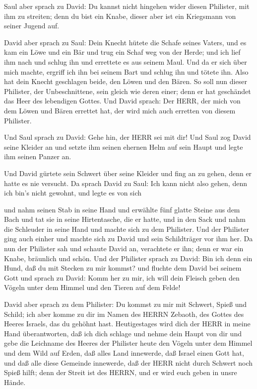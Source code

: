  Saul aber sprach zu David: Du kannst nicht hingehen wider
diesen Philister, mit ihm zu streiten; denn du bist ein Knabe, dieser
aber ist ein Kriegsmann von seiner Jugend auf.

 David aber sprach zu Saul: Dein Knecht hütete die Schafe
seines Vaters, und es kam ein Löwe und ein Bär und trug ein Schaf weg
von der Herde;  und ich lief ihm nach und schlug ihn und
errettete es aus seinem Maul. Und da er sich über mich machte, ergriff
ich ihn bei seinem Bart und schlug ihn und tötete ihn. 
Also hat dein Knecht geschlagen beide, den Löwen und den Bären. So soll
nun dieser Philister, der Unbeschnittene, sein gleich wie deren einer;
denn er hat geschändet das Heer des lebendigen Gottes.  Und
David sprach: Der HERR, der mich von dem Löwen und Bären errettet hat,
der wird mich auch erretten von diesem Philister.

 Und Saul sprach zu David: Gehe hin, der HERR sei mit dir!
Und Saul zog David seine Kleider an und setzte ihm seinen ehernen Helm
auf sein Haupt und legte ihm seinen Panzer an.

 Und David gürtete sein Schwert über seine Kleider und fing
an zu gehen, denn er hatte es nie versucht. Da sprach David zu Saul: Ich
kann nicht also gehen, denn ich bin's nicht gewohnt, und legte es von
sich

 und nahm seinen Stab in seine Hand und erwählte fünf
glatte Steine aus dem Bach und tat sie in seine Hirtentasche, die er
hatte, und in den Sack und nahm die Schleuder in seine Hand und machte
sich zu dem Philister.  Und der Philister ging auch einher
und machte sich zu David und sein Schildträger vor ihm her.
 Da nun der Philister sah und schaute David an, verachtete
er ihn; denn er war ein Knabe, bräunlich und schön.  Und
der Philister sprach zu David: Bin ich denn ein Hund, daß du mit Stecken
zu mir kommst? und fluchte dem David bei seinem Gott  und
sprach zu David: Komm her zu mir, ich will dein Fleisch geben den Vögeln
unter dem Himmel und den Tieren auf dem Felde!

 David aber sprach zu dem Philister: Du kommst zu mir mit
Schwert, Spieß und Schild; ich aber komme zu dir im Namen des HERRN
Zebaoth, des Gottes des Heeres Israels, das du gehöhnt hast.
 Heutigestages wird dich der HERR in meine Hand
überantworten, daß ich dich schlage und nehme dein Haupt von dir und
gebe die Leichname des Heeres der Philister heute den Vögeln unter dem
Himmel und dem Wild auf Erden, daß alles Land innewerde, daß Israel
einen Gott hat,  und daß alle diese Gemeinde innewerde, daß
der HERR nicht durch Schwert noch Spieß hilft; denn der Streit ist des
HERRN, und er wird euch geben in unsre Hände.

